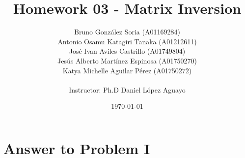 \documentclass[11pt,a4paper]{article}
\title
{
    Homework 03 - Matrix Inversion
}
\author
{    
    Bruno Gonz{\' a}lez Soria (A01169284)  \\
    Antonio Osamu Katagiri Tanaka (A01212611) \\
    Jos{\' e} Ivan Aviles Castrillo (A01749804) \\
    Jes{\' u}s Alberto Mart{\' i}nez Espinosa (A01750270) \\
    Katya Michelle Aguilar P{\' e}rez (A01750272) \\
    \\
    Instructor: Ph.D Daniel L{\' o}pez Aguayo
}
\date{\today}
\providecommand{\keywords}[1]
{
    \\
    \\
    \small
    \textbf{\textit{Keywords:}} #1
}
\begin{document}
\setlength\parindent{0pt} %


\maketitle


\clearpage








\section{Answer to Problem I}\label{sec:P01} %



\clearpage
\end{document}
